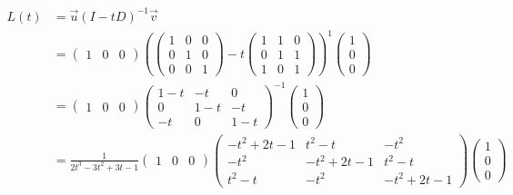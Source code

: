 \begin{align*}
    L(t) & = \vec{u}(I - tD)^{ - 1}\vec{v}                                                                                                     \\
         & = \begin{pmatrix} 1 & 0 & 0 \end{pmatrix} \left( \begin{pmatrix} 1 & 0 & 0 \\ 0 & 1 & 0 \\ 0 & 0 & 1 \end{pmatrix} - t  \begin{pmatrix} 1 & 1 & 0 \\ 0 & 1 & 1 \\ 1 & 0 & 1 \end{pmatrix}\right)^{ 1} \begin{pmatrix} 1 \\ 0 \\ 0 \end{pmatrix} \\
         & = \begin{pmatrix} 1 & 0 & 0 \end{pmatrix} \begin{pmatrix} 1 - t & - t & 0 \\ 0 & 1 - t & - t \\ - t & 0 & 1 - t \end{pmatrix}^{ - 1} \begin{pmatrix} 1 \\ 0 \\ 0 \end{pmatrix}                                           \\
         & = \frac{1}{2 t^3 - 3 t^2 + 3 t - 1} \begin{pmatrix} 1 & 0 & 0 \end{pmatrix}
    \begin{pmatrix} -t^2 + 2 t - 1 & t^2 - t        & - t^2          \\
                -t^2           & -t^2 + 2 t - 1 & t^2 - t        \\
                t^2 - t        & -t^2           & -t^2 + 2 t - 1\end{pmatrix}  \begin{pmatrix} 1 \\ 0 \\ 0 \end{pmatrix}                                                                                     \\

\end{align*}
